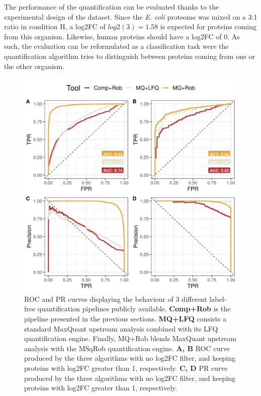 \documentclass[11pt, a4paper]{report}
\begin{document}
The performance of the quantification can be evaluated thanks to the experimental design of the dataset. Since the \textit{E. coli} proteome was mixed on a 3:1 ratio in condition H, a \ac{log2FC} of $log2(3)=1.58$ is expected for proteins coming from this organism. Likewise, human proteins should have a \ac{log2FC} of 0. As such, the evaluation can be reformulated as a classification task were the quantification algorithm tries to distinguish between proteins coming from one or the other organism.


\begin{figure}[!h]
\centering
\includegraphics[width=\textwidth]{curves_plot}
\caption{ROC and PR curves displaying the behaviour of 3 different label-free quantification pipelines publicly available. \textbf{Comp+Rob} is the pipeline presented in the previous sections. \textbf{MQ+LFQ} consists a standard MaxQuant upstream analysis combined with its LFQ quantification engine. Finally, MQ+Rob blends MaxQuant upstream analysis with the MSqRob quantification engine. \textbf{A, B} ROC curve produced by the three algorithms with no \ac{log2FC} filter, and keeping proteins with \ac{log2FC} greater than 1, respectively. \textbf{C, D} PR curve produced by the three algorithms with no \ac{log2FC} filter, and keeping proteins with \ac{log2FC} greater than 1, respectively.}
\label{fig:roc_curves}
\end{figure}
\end{document}
